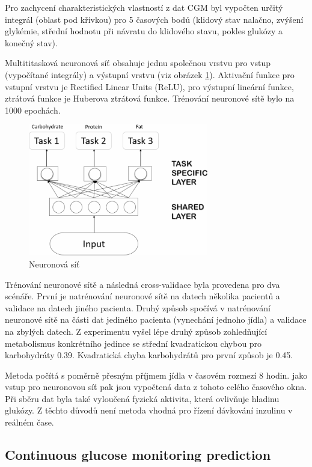 Pro zachycení charakteristických vlastností z dat CGM byl vypočten určitý integrál (oblast pod křivkou) pro 5 časových bodů (klidový stav nalačno, zvýšení glykémie, střední hodnotu při návratu do klidového stavu, pokles glukózy a konečný stav).

Multititasková neuronová síť obsahuje jednu společnou vrstvu pro vstup (vypočítané integrály) a výstupní vrstvu (viz obrázek \ref{fig:neuronka}). Aktivační funkce pro vstupní vrstvu je Rectified Linear Units (ReLU), pro výstupní lineární funkce, ztrátová funkce je Huberova ztrátová funkce. Trénování neuronové sítě bylo na 1000 epochách.

\begin{figure}[H]
\caption{Neuronová síť}
\label{fig:neuronka}
\centering
\includegraphics[width=0.7\textwidth]{img/analyza/neuronka.png}
\end{figure}

Trénování neuronové sítě a následná cross-validace byla provedena pro dva scénáře. První je natrénování neuronové sítě na datech několika pacientů a validace na datech jiného pacienta. Druhý způsob spočívá v natrénování neuronové sítě na části dat jediného pacienta (vynechání jednoho jídla) a validace na zbylých datech. Z experimentu vyšel lépe druhý způsob zohledňující metabolismus konkrétního jedince se střední kvadratickou chybou pro karbohydráty 0.39. Kvadratická chyba karbohydrátů pro první způsob je 0.45. 

Metoda počítá s poměrně přesným příjmem jídla v časovém rozmezí 8 hodin. jako vstup pro neuronovou síť pak jsou vypočtená data z tohoto celého časového okna. Při sběru dat byla také vyloučená fyzická aktivita, která ovlivňuje hladinu glukózy. Z těchto důvodů není metoda vhodná pro řízení dávkování inzulinu v reálném čase.


\subsection{Continuous glucose monitoring prediction \citep{Analyza.LSTM}}

